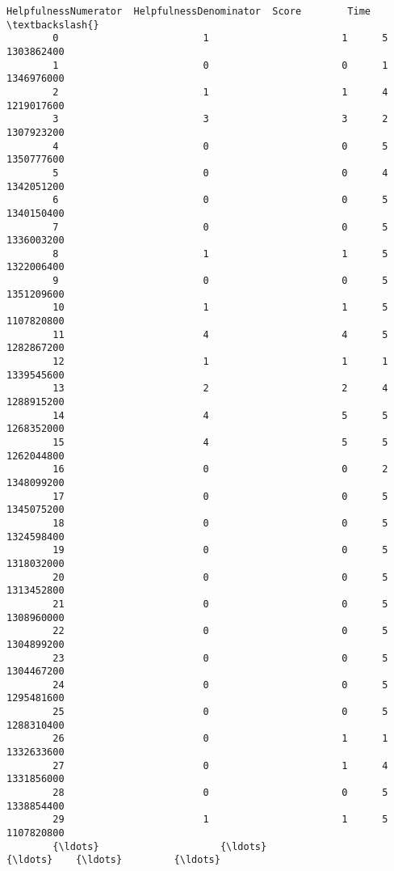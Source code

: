 \documentclass[11pt]{article}
\begin{document}
\begin{Verbatim}[commandchars=\\\{\}]
               HelpfulnessNumerator  HelpfulnessDenominator  Score        Time  \textbackslash{}
        0                         1                       1      5  1303862400   
        1                         0                       0      1  1346976000   
        2                         1                       1      4  1219017600   
        3                         3                       3      2  1307923200   
        4                         0                       0      5  1350777600   
        5                         0                       0      4  1342051200   
        6                         0                       0      5  1340150400   
        7                         0                       0      5  1336003200   
        8                         1                       1      5  1322006400   
        9                         0                       0      5  1351209600   
        10                        1                       1      5  1107820800   
        11                        4                       4      5  1282867200   
        12                        1                       1      1  1339545600   
        13                        2                       2      4  1288915200   
        14                        4                       5      5  1268352000   
        15                        4                       5      5  1262044800   
        16                        0                       0      2  1348099200   
        17                        0                       0      5  1345075200   
        18                        0                       0      5  1324598400   
        19                        0                       0      5  1318032000   
        20                        0                       0      5  1313452800   
        21                        0                       0      5  1308960000   
        22                        0                       0      5  1304899200   
        23                        0                       0      5  1304467200   
        24                        0                       0      5  1295481600   
        25                        0                       0      5  1288310400   
        26                        0                       1      1  1332633600   
        27                        0                       1      4  1331856000   
        28                        0                       0      5  1338854400   
        29                        1                       1      5  1107820800   
        {\ldots}                     {\ldots}                     {\ldots}    {\ldots}         {\ldots}   

\end{Verbatim}
\end{document}

